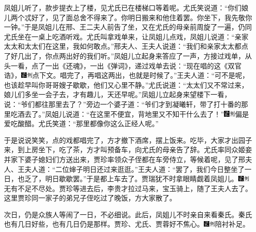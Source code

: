 凤姐儿听了，款步提衣上了楼，见尤氏已在楼梯口等着呢。尤氏笑说道：``你们娘儿两个忒好了，见了面总舍不得来了。你明日搬来和他住着罢。你坐下，我先敬你一钟。''于是凤姐儿在邢、王二夫人前告了坐，又在尤氏的母亲前周旋了一遍，仍同尤氏坐在一桌上吃酒听戏。尤氏叫拿戏单来，让凤姐儿点戏，凤姐儿说道：``亲家太太和太太们在这里，我如何敢点。''邢夫人、王夫人说道：``我们和亲家太太都点了好几出了，你点两出好的我们听。''凤姐儿立起身来答应了一声，方接过戏单，从头一看，点了一出《还魂》，一出《弹词》，递过戏单去说：``现在唱的这《双官诰》，{\includegraphics[width=3mm]{../Images/00006}\includegraphics[width=3mm]{../Images/00011}\footnotesize \kaishu 点下文。}唱完了，再唱这两出，也就是时候了。''王夫人道：``可不是呢，也该趁早叫你哥哥嫂子歇歇，他们又心里不静。''尤氏说道：``太太们又不常过来，娘儿们多坐一会子去，才有趣儿，天还早呢。''凤姐儿立起身来望楼下一看，说：``爷们都往那里去了？''旁边一个婆子道：``爷们才到凝曦轩，带了打十番的那里吃酒去了。''凤姐儿说道：``在这里不便宜，背地里又不知干什么去了！''{\includegraphics[width=3mm]{../Images/00006}\includegraphics[width=3mm]{../Images/00011}\footnotesize \kaishu 偏是爱吃酸醋。}尤氏笑道：``那里都像你这么正经人呢。''

于是说说笑笑，点的戏都唱完了，方才撤下酒席，摆上饭来。吃毕，大家才出园子来，到上房坐下，吃了茶，方才叫预备车，向尤氏的母亲告了辞。尤氏率同众姬妾并家下婆子媳妇们方送出来，贾珍率领众子侄都在车旁侍立，等候着呢，见了邢夫人、王夫人道：``二位婶子明日还过来逛逛。''王夫人道：``罢了，我们今日整坐了一日，也乏了，明日歇歇罢。''于是都上车去了。贾瑞犹不时拿眼睛觑着凤姐儿。{\includegraphics[width=3mm]{../Images/00006}\includegraphics[width=3mm]{../Images/00011}\footnotesize \kaishu 无有不足不尽处。}贾珍等进去后，李贵才拉过马来，宝玉骑上，随了王夫人去了。这里贾珍同一家子的弟兄子侄吃过了晚饭，方大家散了。

次日，仍是众族人等闹了一日，不必细说。此后，凤姐儿不时亲自来看秦氏。秦氏也有几日好些，也有几日仍是那样。贾珍、尤氏、贾蓉好不焦心。{\includegraphics[width=3mm]{../Images/00006}\includegraphics[width=3mm]{../Images/00011}\footnotesize \kaishu 陪衬补足。}

